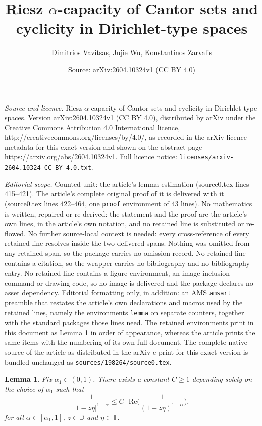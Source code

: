 \documentclass[10pt,a4paper]{amsart}
\title{Riesz $\alpha$-capacity of Cantor sets and cyclicity in Dirichlet-type spaces}
\author{Dimitrios Vavitsas, Jujie Wu, Konstantinos Zarvalis}
\date{Source: arXiv:2604.10324v1 (CC BY 4.0)}
\newtheorem{lemma}{Lemma}
\newcommand\DD{{\mathbb D}}
\newcommand\TT{{\mathbb T}}
\begin{document}
\maketitle

\noindent\emph{Source and licence.} Riesz $\alpha$-capacity of Cantor sets and cyclicity in Dirichlet-type spaces. Version arXiv:2604.10324v1 (CC BY 4.0), distributed by arXiv under the Creative Commons Attribution 4.0 International licence, http://creativecommons.org/licenses/by/4.0/, as recorded in the arXiv licence metadata for this exact version and shown on the abstract page https://arxiv.org/abs/2604.10324v1. Full licence notice: \texttt{licenses/arxiv-2604.10324-CC-BY-4.0.txt}.\par\smallskip

\noindent\textit{Editorial scope.} Counted unit: the article's lemma estimation (source0.tex lines 415--421). The article's complete original proof of it is delivered with it (source0.tex lines 422--464, one \texttt{proof} environment of 43 lines). No mathematics is written, repaired or re-derived: the statement and the proof are the article's own lines, in the article's own notation, and no retained line is substituted or re-flowed.  No further source-local context is needed: every cross-reference of every retained line resolves inside the two delivered spans.  Nothing was omitted from any retained span, so the package carries no omission record.  No retained line contains a citation, so the wrapper carries no bibliography and no bibliography entry.  No retained line contains a figure environment, an image-inclusion command or drawing code, so no image is delivered and the package declares no asset dependency.  Editorial formatting only, in addition: an AMS \texttt{amsart} preamble that restates the article's own declarations and macros used by the retained lines, namely the environments \texttt{lemma} on separate counters, together with the standard packages those lines need.  The retained environments print in this document as Lemma 1 in order of appearance, whereas the article prints the same items with the numbering of its own full document.  The complete native source of the article as distributed in the arXiv e-print for this exact version is bundled unchanged as \texttt{sources/198264/source0.tex}.
\begin{lemma}\label{Real estimation}
Fix $\alpha_1\in (0,1)$. There exists a constant $C\ge1$ depending solely on the choice of $\alpha_1$ such that
\begin{equation*}
\frac{1}{|1-z\overline{\eta}|^{1-\alpha}}\leq C \text{ }\mathrm{Re}\Big(\frac{1}{(1-z\overline{\eta})^{1-\alpha}}\Big),  
\end{equation*} 
for all $\alpha\in [\alpha_1,1]$, $z\in\DD$ and $\eta\in\TT$.
\end{lemma}
\end{document}
